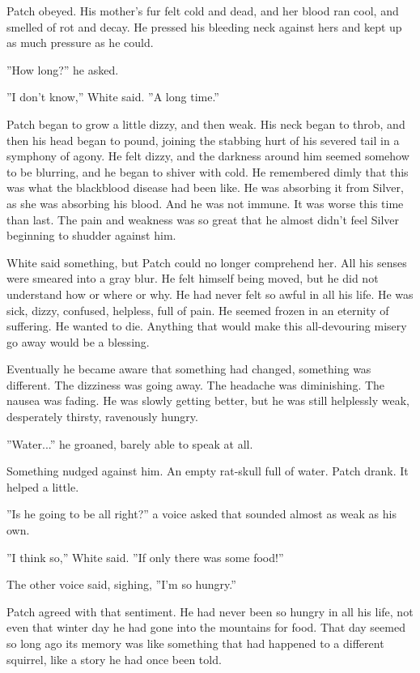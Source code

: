 \documentclass[12pt]{book}
\begin{document}
Patch obeyed. His mother's fur felt cold and dead, and her blood ran cool, and smelled of rot and decay. He pressed his bleeding neck against hers and kept up as much pressure as he could.

''How long?'' he asked.

''I don't know,'' White said. ''A long time.''

Patch began to grow a little dizzy, and then weak. His neck began to throb, and then his head began to pound, joining the stabbing hurt of his severed tail in a symphony of agony. He felt dizzy, and the darkness around him seemed somehow to be blurring, and he began to shiver with cold. He remembered dimly that this was what the blackblood disease had been like. He was absorbing it from Silver, as she was absorbing his blood. And he was not immune. It was worse this time than last. The pain and weakness was so great that he almost didn't feel Silver beginning to shudder against him.

White said something, but Patch could no longer comprehend her. All his senses were smeared into a gray blur. He felt himself being moved, but he did not understand how or where or why. He had never felt so awful in all his life. He was sick, dizzy, confused, helpless, full of pain. He seemed frozen in an eternity of suffering. He wanted to die. Anything that would make this all-devouring misery go away would be a blessing.

Eventually he became aware that something had changed, something was different. The dizziness was going away. The headache was diminishing. The nausea was fading. He was slowly getting better, but he was still helplessly weak, desperately thirsty, ravenously hungry.

''Water...'' he groaned, barely able to speak at all.

Something nudged against him. An empty rat-skull full of water. Patch drank. It helped a little.

''Is he going to be all right?'' a voice asked that sounded almost as weak as his own.

''I think so,'' White said. ''If only there was some food!''

The other voice said, sighing, ''I'm so hungry.''

Patch agreed with that sentiment. He had never been so hungry in all his life, not even that winter day he had gone into the mountains for food. That day seemed so long ago its memory was like something that had happened to a different squirrel, like a story he had once been told.
\end{document}
